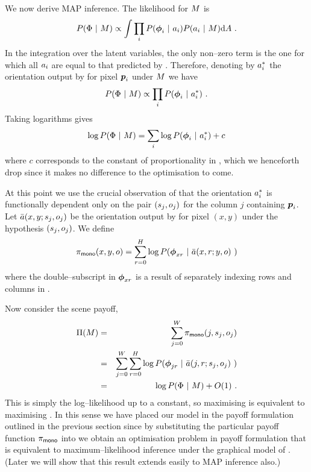 We now derive MAP inference. The likelihood for $\Scene$ is
\begin{equation}
  \label{eq:photometric-lik-full}
  P(\Features ~|~ \Scene) \propto 
  \int
    \prod_i P(\Feature_i ~|~ \Orient_i) 
            P(\Orient_i ~|~ \Scene)
  \intd \Orients ~.
\end{equation}
In the integration over the latent variables, the only
non--zero term is the one for which all $\Orient_i$ are equal to that
predicted by . Therefore, denoting by
$\PredictedOrient_i$ the orientation output by
 for pixel $\Pixel_i$ under $\Scene$ we
have
\begin{equation}
  \label{eq:photometric-lik}
  P(\Features ~|~ \Scene) \propto
    \prod_i P(\Feature_i ~|~ \PredictedOrient_i) ~.
\end{equation}
Taking logarithms gives
\begin{equation}
  \label{eq:photometric-loglik}
  \log P(\Features ~|~ \Scene) =
    \sum_i \log P(\Feature_i ~|~ \Orient_i^*) + c
\end{equation}
where $c$ corresponds to the constant of proportionality in
, which we henceforth drop since it makes no
difference to the optimisation to come. 

At this point we use the crucial observation of
 that the orientation
$\PredictedOrient_i$ is functionally dependent only on the pair
$(\seam_j,\WallOrient_j)$ for the column $j$ containing
$\Pixel_i$. Let $\ComputedOrient(x,y;\seam_j,\WallOrient_j)$ be the
orientation output by  for pixel $(x,y)$
under the hypothesis $(\seam_j,\WallOrient_j)$. We define
\begin{equation}
  \label{eq:mono-payoffs}
  \MonoPayoff(x,y,\WallOrient) = \sum_{r=0}^H \log 
    P(\Feature_{xr} ~|~ \ComputedOrient(x,r;y,\WallOrient)~)
\end{equation}
where the double--subscript in $\Feature_{xr}$ is a result of
separately indexing rows and columns in . 

Now consider the scene payoff,
\begin{eqnarray}
  \ScenePayoff(\Scene) &=& 
    \sum_{j=0}^W \MonoPayoff(j, \seam_j, \WallOrient_j) \\
  &=& 
    \sum_{j=0}^W \sum_{r=0}^H \log
      P(\Feature_{jr} ~|~ \ComputedOrient(j,r;\seam_j,\WallOrient_j)~)\\
  &=&
    \log P(\Features ~|~ \Scene) + O(1)  ~.
    \label{eq:photometric-in-scene-payoff}
\end{eqnarray}
This is simply the log--likelihood  up to a
constant, so maximising  is
equivalent to maximising . In this sense we
have placed our model in the payoff formulation outlined in the
previous section since by substituting the particular payoff function
$\MonoPayoff$ into  we obtain an optimisation
problem in payoff formulation that is equivalent to
maximum--likelihood inference under the graphical model of
. (Later we will show that this result extends
easily to MAP inference also.)

